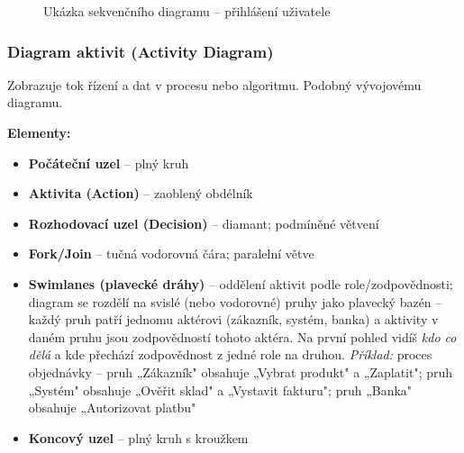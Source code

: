 \begin{figure}[H]
\centering
{}
\caption{Ukázka sekvenčního diagramu -- přihlášení uživatele}
\label{fig:seqdiag}
\end{figure}

\subsubsection{Diagram aktivit (Activity Diagram)}

Zobrazuje tok řízení a dat v procesu nebo algoritmu. Podobný vývojovému diagramu.

\textbf{Elementy:}
\begin{itemize}
  \item \textbf{Počáteční uzel} -- plný kruh
  \item \textbf{Aktivita (Action)} -- zaoblený obdélník
  \item \textbf{Rozhodovací uzel (Decision)} -- diamant; podmíněné větvení
  \item \textbf{Fork/Join} -- tučná vodorovná čára; paralelní větve
  \item \textbf{Swimlanes (plavecké dráhy)} -- oddělení aktivit podle role/zodpovědnosti;
    diagram se rozdělí na svislé (nebo vodorovné) pruhy jako plavecký bazén -- každý pruh
    patří jednomu aktérovi (zákazník, systém, banka) a aktivity v daném pruhu jsou
    zodpovědností tohoto aktéra. Na první pohled vidíš \textit{kdo co dělá} a kde přechází
    zodpovědnost z jedné role na druhou.
    \textit{Příklad:} proces objednávky -- pruh „Zákazník" obsahuje „Vybrat produkt" a
    „Zaplatit"; pruh „Systém" obsahuje „Ověřit sklad" a „Vystavit fakturu"; pruh „Banka"
    obsahuje „Autorizovat platbu"
  \item \textbf{Koncový uzel} -- plný kruh s kroužkem
\end{itemize}

